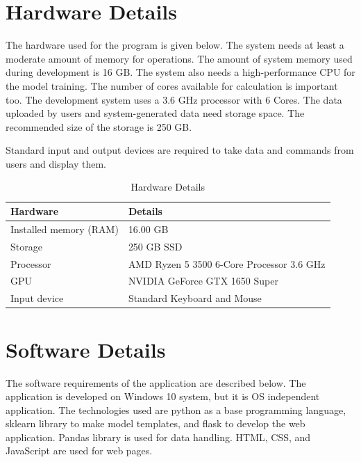 \section{Hardware Details} \label{sec:hardware_details}
The hardware used for the program is given below. The system needs at least a moderate amount of memory for operations. The amount of system memory used during development is 16 GB. The system also needs a high-performance CPU for the model training. The number of cores available for calculation is important too. The development system uses a 3.6 GHz processor with 6 Cores. The data uploaded by users and system-generated data need storage space. The recommended size of the storage is 250 GB.

Standard input and output devices are required to take data and commands from users and display them.

\begin{table}[H]
  \centering
  \caption{Hardware Details} \label{tab:hardware_details}
  \begin{tabular}{|L{10em}|L{25em}|}
    \hline
    \textbf{Hardware}      & \textbf{Details}
    \rule[-2ex]{0pt}{4ex}                                              \\\hline
    Installed memory (RAM) & 16.00 GB
    \rule[-2ex]{0pt}{4ex}                                              \\\hline
    Storage                & 250 GB SSD
    \rule[-2ex]{0pt}{4ex}                                              \\\hline
    Processor              & AMD Ryzen 5 3500 6-Core Processor 3.6 GHz
    \rule[-2ex]{0pt}{4ex}                                              \\\hline
    GPU                    & NVIDIA GeForce GTX 1650 Super
    \rule[-2ex]{0pt}{4ex}                                              \\\hline
    Input device           & Standard Keyboard and Mouse
    \rule[-2ex]{0pt}{4ex}                                              \\\hline
  \end{tabular}
\end{table}

\section{Software Details} \label{sec:software_details}
The software requirements of the application are described below. The application is developed on Windows 10 system, but it is OS independent application. The technologies used are python as a base programming language, sklearn library to make model templates, and flask to develop the web application. Pandas library is used for data handling. HTML, CSS, and JavaScript are used for web pages.

